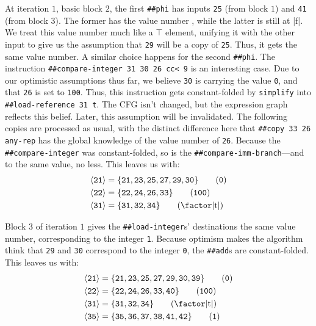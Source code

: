 At iteration $1$, basic block $2$, the first \Verb|##phi| has inputs
\Verb|25| (from block $1$) and \Verb|41| (from block $3$).  The former has
the value number , while the latter is still at \factor|f|.  We treat
this value number much like a $\top$ element, unifying it with the other input
to give us the assumption that \Verb|29| will be a copy of \Verb|25|.
Thus, it gets the same value number.  A similar choice happens for the second
\Verb|##phi|.  The instruction 
%
\Verb|##compare-integer 31 30 26 cc< 9|
%
is an interesting case.  Due to our optimistic assumptions thus far, we believe
\Verb|30| is carrying the value \Verb|0|, and that \Verb|26| is set to
\Verb|100|.  Thus, this instruction gets constant-folded by \Verb|simplify|
into
%
\Verb|##load-reference 31 t|.
%
The \gls{CFG} isn't changed, but the expression graph reflects this belief.
Later, this assumption will be invalidated.  The following copies are processed
as usual, with the distinct difference here that 
%
\Verb|##copy 33 26 any-rep|
%
has the global knowledge of the value number of \Verb|26|.  Because the
\Verb|##compare-integer| was constant-folded, so is the
\Verb|##compare-imm-branch|---and to the same value, no less.  This leaves us
with:
%
\begin{align*}
  \vn{21} &= \{\vreg{21},
               \vreg{23},
               \vreg{25},
               \vreg{27},
               \vreg{29},
               \vreg{30}\} \tag{\texttt{0}} \\
  \vn{22} &= \{\vreg{22},
               \vreg{24},
               \vreg{26},
               \vreg{33}\} \tag{\texttt{100}} \\
  \vn{31} &= \{\vreg{31},
               \vreg{32},
               \vreg{34}\} \tag{\text{\factor|t|}}
\end{align*}

Block $3$ of iteration $1$ gives the \Verb|##load-integer|s' destinations the
same value number, corresponding to the integer \Verb|1|.  Because optimism
makes the algorithm think that \Verb|29| and \Verb|30| correspond to the
integer \Verb|0|, the \Verb|##add|s are constant-folded.  This leaves us with:
%
\begin{align*}
  \vn{21} &= \{\vreg{21},
               \vreg{23},
               \vreg{25},
               \vreg{27},
               \vreg{29},
               \vreg{30},
               \vreg{39}\} \tag{\texttt{0}} \\
  \vn{22} &= \{\vreg{22},
               \vreg{24},
               \vreg{26},
               \vreg{33},
               \vreg{40}\} \tag{\texttt{100}} \\
  \vn{31} &= \{\vreg{31},
               \vreg{32},
               \vreg{34}\} \tag{\text{\factor|t|}} \\
  \vn{35} &= \{\vreg{35},
               \vreg{36},
               \vreg{37},
               \vreg{38},
               \vreg{41},
               \vreg{42}\} \tag{\texttt{1}}
\end{align*}

